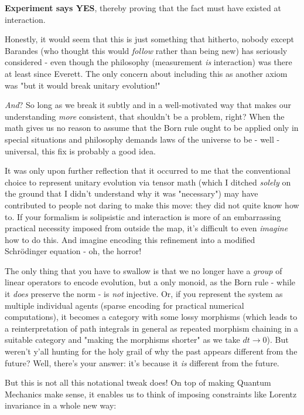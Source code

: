 \documentclass{article}
\begin{document}
\textbf{Experiment says YES}, thereby proving that the fact must have existed at interaction.

Honestly, it would seem that this is just something that hitherto, nobody except Barandes (who thought this would \textit{follow} rather than being new) has seriously considered - even though the philosophy (measurement \textit{is} interaction) was there at least since Everett. The only concern about including this as another axiom was "but it would break unitary evolution!"

\textit{And}? So long as we break it subtly and in a well-motivated way that makes our understanding \textit{more} consistent, that shouldn't be a problem, right? When the math gives us no reason to assume that the Born rule ought to be applied only in special situations and philosophy demands laws of the universe to be - well - universal, this fix is probably a good idea.

It was only upon further reflection that it occurred to me that the conventional choice to represent unitary evolution via tensor math (which I ditched \textit{solely} on the ground that I didn't understand why it was "necessary") may have contributed to people not daring to make this move: they did not quite know how to. If your formalism is solipsistic and interaction is more of an embarrassing practical necessity imposed from outside the map, it's difficult to even \textit{imagine} how to do this. And imagine encoding this refinement into a modified Schrödinger equation - oh, the horror!

The only thing that you have to swallow is that we no longer have a \textit{group} of linear operators to encode evolution, but a only monoid, as the Born rule - while it \textit{does} preserve the norm - is \textit{not} injective. Or, if you represent the system as multiple individual agents (sparse encoding for practical numerical computations), it becomes a category with some lossy morphisms (which leads to a reinterpretation of path integrals in general as repeated morphism chaining in a suitable category and "making the morphisms shorter" as we take $dt\to 0$). But weren't y'all hunting for the holy grail of why the past appears different from the future? Well, there's your answer: it's because it \textit{is} different from the future.

But this is not all this notational tweak does! On top of making Quantum Mechanics make sense, it enables us to think of imposing constraints like Lorentz invariance in a whole new way:
\end{document}
